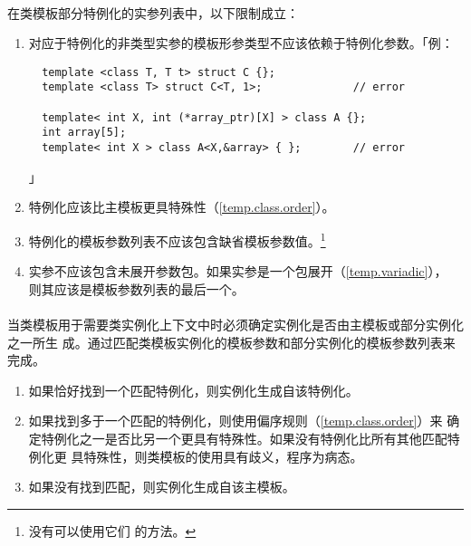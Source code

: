 \paragraph{}
在类模板部分特例化的实参列表中，以下限制成立：
\begin{enumerate}
  \item{对应于特例化的非类型实参的模板形参类型不应该依赖于特例化参数。「例：
\begin{lstlisting}
  template <class T, T t> struct C {};
  template <class T> struct C<T, 1>;              // error

  template< int X, int (*array_ptr)[X] > class A {};
  int array[5];
  template< int X > class A<X,&array> { };        // error
\end{lstlisting}」}
  \item{特例化应该比主模板更具特殊性（\ref{temp.class.order}）。}
  \item{特例化的模板参数列表不应该包含缺省模板参数值。\footnote{没有可以使用它们
    的方法。}}
  \item{实参不应该包含未展开参数包。如果实参是一个包展开（\ref{temp.variadic}），
    则其应该是模板参数列表的最后一个。}
\end{enumerate}

\paragraph{}
当类模板用于需要类实例化上下文中时必须确定实例化是否由主模板或部分实例化之一所生
成。通过匹配类模板实例化的模板参数和部分实例化的模板参数列表来完成。
\begin{enumerate}
  \item{如果恰好找到一个匹配特例化，则实例化生成自该特例化。}
  \item{如果找到多于一个匹配的特例化，则使用偏序规则（\ref{temp.class.order}）来
    确定特例化之一是否比另一个更具有特殊性。如果没有特例化比所有其他匹配特例化更
    具特殊性，则类模板的使用具有歧义，程序为病态。}
  \item{如果没有找到匹配，则实例化生成自该主模板。}
\end{enumerate}

